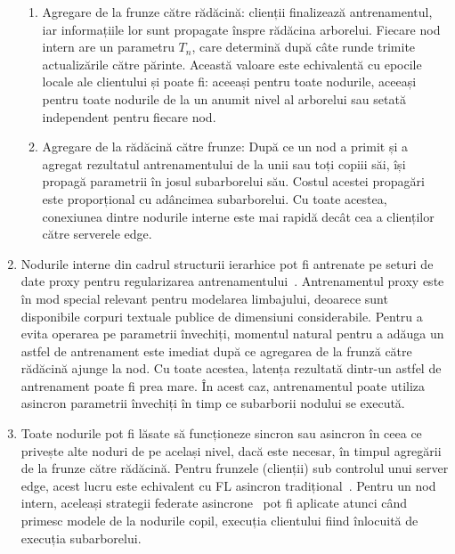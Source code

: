\begin{enumerate}
          \begin{enumerate}
              \item Agregare de la frunze către rădăcină: clienții finalizează antrenamentul, iar informațiile lor sunt propagate înspre rădăcina arborelui. Fiecare nod intern are un parametru $T_n$, care determină după câte runde trimite actualizările către părinte. Această valoare este echivalentă cu epocile locale ale clientului și poate fi: aceeași pentru toate nodurile, aceeași pentru toate nodurile de la un anumit nivel al arborelui sau setată independent pentru fiecare nod.
              \item Agregare de la rădăcină către frunze: După ce un nod a primit și a agregat rezultatul antrenamentului de la unii sau toți copiii săi, își propagă parametrii în josul subarborelui său. Costul acestei propagări este proporțional cu adâncimea subarborelui. Cu toate acestea, conexiunea dintre nodurile interne este mai rapidă decât cea a clienților către serverele edge.
          \end{enumerate}
    \item Nodurile interne din cadrul structurii ierarhice pot fi antrenate pe seturi de date proxy pentru regularizarea antrenamentului~\citep{OneShotFL,FLwithNonIID}. Antrenamentul proxy este în mod special relevant pentru modelarea limbajului, deoarece sunt disponibile corpuri textuale publice de dimensiuni considerabile. Pentru a evita operarea pe parametrii învechiți, momentul natural pentru a adăuga un astfel de antrenament este imediat după ce agregarea de la frunză către rădăcină ajunge la nod. Cu toate acestea, latența rezultată dintr-un astfel de antrenament poate fi prea mare. În acest caz, antrenamentul poate utiliza asincron parametrii învechiți în timp ce subarborii nodului se execută.
    \item Toate nodurile pot fi lăsate să funcționeze sincron sau asincron în ceea ce privește alte noduri de pe același nivel, dacă este necesar, în timpul agregării de la frunze către rădăcină. Pentru frunzele (clienții) sub controlul unui server edge, acest lucru este echivalent cu FL asincron tradițional~\citep{AsynchronousFLonHetDevicesSurvey}. Pentru un nod intern, aceleași strategii federate asincrone~\citep{FedBuff,PAPAYA} pot fi aplicate atunci când primesc modele de la nodurile copil, execuția clientului fiind înlocuită de execuția subarborelui.
\end{enumerate}

